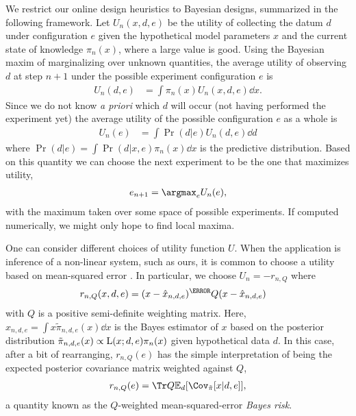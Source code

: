 \documentclass[aps,nofootinbib,twocolumn,superscriptaddress]{revtex4}
\newcommand{\mps}{x}
\newcommand{\eps}{e}
\newcommand{\data}{d}
\begin{document}
We restrict our online design heuristics to Bayesian designs,
summarized in the following framework.
Let $U_n(\mps,\data,\eps)$ be the utility of collecting the datum
$\data$ under configuration $\eps$ given the hypothetical
model parameters $\mps$ and the current state of knowledge $\pi_n(\mps)$,
where a large value is good.
Using the Bayesian maxim of marginalizing over unknown quantities,
the average utility of observing $\data$ at step $n+1$ under 
the possible experiment configuration $\eps$ is
\begin{align}
    U_n(\data,\eps) 
        &= \int \pi_n(\mps)U_n(\mps,\data,\eps)\dd\mps.
\end{align}
Since we do not know \textit{a priori} which $\data$ will 
occur (not having performed the experiment yet) the average 
utility of the possible configuration $\eps$ as a whole is
\begin{align}
    U_n(\eps) 
        &= \int\Pr(\data|\eps)U_n(\data,\eps) \dd\data
\end{align}
where $\Pr(\data|\eps)=\int \Pr(\data|\mps,\eps)\pi_n(\mps)\dd\mps$ is the
predictive distribution.
Based on this quantity we can choose the next experiment to be
the one that maximizes utility,
\begin{align}
    \eps_{n+1} = \argmax_\eps U_n(\eps),
\end{align}
with the maximum taken over some space of possible experiments.
If computed numerically, we might only hope to find local maxima.

One can consider different choices of utility function $U$.
When the application is inference of a non-linear system, such as 
ours, it is common to choose a utility based on 
mean-squared error \cite{chaloner_bayesian_1995}.
In particular, we choose $U_n=-r_{n,Q}$ where
\begin{align}
    r_{n,Q}(\mps,\data,\eps)
        &= (\mps - \hat\mps_{n,\data,\eps})^\T Q (\mps - \hat\mps_{n,\data,\eps})
\end{align}
with $Q$ is a positive semi-definite weighting matrix.
Here, $\hat{\mps}_{n,\data,\eps}=\int \mps \tilde{\pi}_{n,\data,\eps}(\mps)\dd\mps$
is the Bayes estimator of $\mps$ based on the posterior distribution
$\tilde{\pi}_{n,\data,\eps}(\mps)\propto \Lhood(\mps;\data,\eps)\pi_n(\mps)$
given hypothetical data $\data$.
In this case, after a bit of rearranging, 
$r_{n,Q}(\eps)$ has the simple interpretation 
of being the expected posterior covariance matrix weighted
against $Q$,
\begin{align}
    r_{n,Q}(\eps) = \Tr Q\expect_\data[\Cov_{\tilde{\pi}}
        [\mps|\data,\eps]],
    \label{eq:bayes-risk}
\end{align}
a quantity known as the $Q$-weighted 
mean-squared-error \textit{Bayes risk}.
\end{document}
